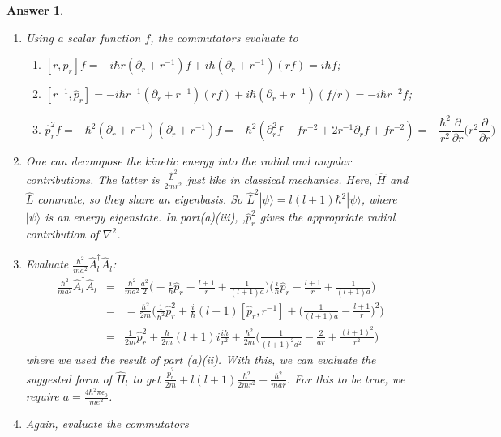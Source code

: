 \documentclass[a4paper]{article}
\newtheorem{ans}{Answer}[subsection]
\theoremstyle{new}
\begin{document}
\newpage
\begin{ans}\leavevmode
\begin{enumerate}[label=(\alph*)]
\item Using a scalar function $f$, the commutators evaluate to
\begin{enumerate}[label=(\roman*)]
    \item $[r,\hat{p}_r]f=-i\hbar r(\partial_r+r^{-1})f+i\hbar(\partial_r+r^{-1})(rf)=i\hbar f$;
    \item $[r^{-1},\hat{p}_r]=-i\hbar r^{-1}(\partial_r+r^{-1})(rf)+i\hbar(\partial_r+r^{-1})(f/r)=-i\hbar r^{-2}f$;
    \item 
    $$\hat{p}_r^2f=-\hbar^2(\partial_r+r^{-1})(\partial_r+r^{-1})f=-\hbar^2(\partial_r^2f-fr^{-2}+2r^{-1}\partial_rf+fr^{-2})=-\frac{\hbar^2}{r^2}\frac{\partial}{\partial r}\bigg(r^2\frac{\partial}{\partial r}\bigg)$$
\end{enumerate}
\item One can decompose the kinetic energy into the radial and angular contributions. The latter is $\frac{\hat{L}^2}{2mr^2}$ just like in classical mechanics. Here, $\hat{H}$ and $\hat{L}$ commute, so they share an eigenbasis. So $\hat{L}^2|\psi\rangle=l(l+1)\hbar^2|\psi\rangle$, where $|\psi\rangle$ is an energy eigenstate. In part(a)(iii), ,$\hat{p}_r^2$ gives the appropriate radial contribution of $\nabla^2$.
\item Evaluate $\frac{\hbar^2}{ma^2}\hat{A}_l^\dag\hat{A}_l$:
\begin{eqnarray}
\frac{\hbar^2}{ma^2}\hat{A}_l^\dag\hat{A}_l&=&\frac{\hbar^2}{ma^2}\frac{a^2}{2}\bigg(-\frac{i}{\hbar}\hat{p}_r-\frac{l+1}{r}+\frac{1}{(l+1)a}\bigg)\bigg(\frac{i}{\hbar}\hat{p}_r-\frac{l+1}{r}+\frac{1}{(l+1)a}\bigg)\nonumber\\&=&=\frac{\hbar^2}{2m}\bigg(\frac{1}{\hbar^2}\hat{p}_r^2+\frac{i}{\hbar}(l+1)[\hat{p}_r,r^{-1}]+\bigg(\frac{1}{(l+1)a}-\frac{l+1}{r}\bigg)^2\bigg)\nonumber\\&=&\frac{1}{2m}\hat{p}_r^2+\frac{\hbar}{2m}(l+1)i\frac{i\hbar}{r^2}+\frac{\hbar^2}{2m}\bigg(\frac{1}{(l+1)^2a^2}-\frac{2}{ar}+\frac{(l+1)^2}{r^2}\bigg)\nonumber
\end{eqnarray}
where we used the result of part (a)(ii). With this, we can evaluate the suggested form of $\hat{H}_l$ to get $\frac{\hat{p}_r^2}{2m}+l(l+1)\frac{\hbar^2}{2mr^2}-\frac{\hbar^2}{mar}$. For this to be true, we require $a=\frac{4\hbar^2\pi\epsilon_0}{me^2}$.
\item Again, evaluate the commutators
\begin{enumerate}[label=(\roman*)]

\end{enumerate}
\end{enumerate}
\end{ans}
\end{document}
